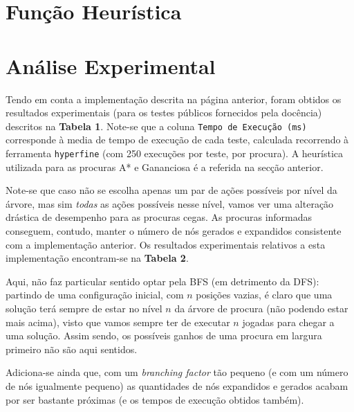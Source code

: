 \documentclass[12pt,a4paper]{article}
\begin{document}
\section*{Função Heurística}

\section*{Análise Experimental}

Tendo em conta a implementação descrita na página anterior, foram obtidos
os resultados experimentais (para os testes públicos fornecidos pela docência)
descritos na \textbf{Tabela 1}. Note-se que a coluna \texttt{Tempo de Execução (ms)}
corresponde à media de tempo de execução de cada teste, calculada recorrendo à ferramenta
\texttt{hyperfine} (com 250 execuções por teste, por procura). A heurística
utilizada para as procuras A* e Gananciosa é a referida na secção anterior.

Note-se que caso não se escolha apenas um par de ações possíveis por nível da árvore,
mas sim \textit{todas} as ações possíveis nesse nível, vamos ver uma alteração
drástica de desempenho para as procuras cegas. As procuras informadas conseguem, contudo,
manter o número de nós gerados e expandidos consistente com a implementação anterior.
Os resultados experimentais relativos a esta implementação encontram-se na \textbf{Tabela 2}.


Aqui, não faz particular sentido optar pela BFS (em detrimento da DFS): partindo
de uma configuração inicial, com $n$ posições vazias, é claro que uma solução
terá sempre de estar no nível $n$ da árvore de procura (não podendo estar mais
acima), visto que vamos sempre ter de executar $n$ jogadas para chegar a uma
solução. Assim sendo, os possíveis ganhos de uma procura em largura primeiro não são
aqui sentidos.

Adiciona-se ainda que, com um \textit{branching factor} tão pequeno (e com
um número de nós igualmente pequeno) as quantidades de nós expandidos e gerados
acabam por ser bastante próximas (e os tempos de execução obtidos também).



\end{document}
